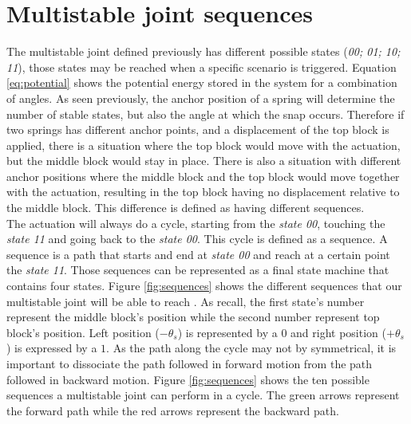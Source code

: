     \section{Multistable joint sequences}\label{sec:sequences}
        The multistable joint defined previously has different possible states (\textit{00; 01; 10; 11}), those states may be reached when a specific scenario is triggered. Equation \ref{eq:potential} shows the potential energy stored in the system for a combination of angles. As seen previously, the anchor position of a spring will determine the number of stable states, but also the angle at which the snap occurs. Therefore if two springs has different anchor points, and a displacement of the top block is applied, there is a situation where the top block would move with the actuation, but the middle block would stay in place. There is also a situation with different anchor positions where the middle block and the top block would move together with the actuation, resulting in the top block having no displacement relative to the middle block. This difference is defined as having different sequences.\\
        The actuation will always do a cycle, starting from the \textit{state 00}, touching the \textit{state 11} and going back to the \textit{state 00}. This cycle is defined as a sequence. A sequence is a path that starts and end at \textit{state 00} and reach at a certain point the \textit{state 11}. Those sequences can be represented as a final state machine that contains four states. Figure \ref{fig:sequences} shows the different sequences that our multistable joint will be able to reach \cite{mo_main_paper}. As recall, the first state's number represent the middle block's position while the second number represent top block's position. Left position ($-\theta_s$) is represented by a $0$ and right position ($+\theta_s$) is expressed by a $1$. As the path along the cycle may not by symmetrical, it is important to dissociate the path followed in forward motion from the path followed in backward motion. Figure \ref{fig:sequences} shows the ten possible sequences a multistable joint can perform in a cycle. The green arrows represent the forward path while the red arrows represent the backward path. \\
        

